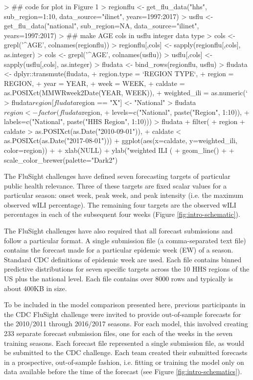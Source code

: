 \documentclass{article}
\begin{document}
\begin{Schunk}
\begin{Sinput}
> ## code for plot in Figure 1
> regionflu <- get_flu_data("hhs", sub_region=1:10, data_source="ilinet", years=1997:2017)
> usflu <- get_flu_data("national", sub_region=NA, data_source="ilinet", years=1997:2017)
> ## make AGE cols in usflu integer data type
> cols <- grepl('^AGE', colnames(regionflu))
> regionflu[,cols] <- sapply(regionflu[,cols], as.integer)
> cols <- grepl('^AGE', colnames(usflu))
> usflu[,cols] <- sapply(usflu[,cols], as.integer)
> fludata <- bind_rows(regionflu, usflu)
> fludata <- dplyr::transmute(fludata,
+     region.type = `REGION TYPE`,
+     region = REGION,
+     year = YEAR,
+     week = WEEK,
+     caldate = as.POSIXct(MMWRweek2Date(YEAR, WEEK)),
+     weighted_ili = as.numeric(`%
> fludata$region[fludata$region == "X"] <- "National"
> fludata$region <- factor(fludata$region, 
+     levels=c("National", paste("Region", 1:10)),
+     labels=c("National", paste("HHS Region", 1:10)))
> fludata %
+     filter(
+         region %
+         caldate > as.POSIXct(as.Date("2010-09-01")),
+         caldate < as.POSIXct(as.Date("2017-08-01"))) %
+     ggplot(aes(x=caldate, y=weighted_ili, color=region)) + 
+     xlab(NULL) + ylab("weighted ILI (%
+     geom_line() +
+     scale_color_brewer(palette="Dark2")
\end{Sinput}
\end{Schunk}


The FluSight challenges have defined seven forecasting targets of particular public health relevance. Three of these targets are fixed scalar values for a particular season: onset week, peak week, and peak intensity (i.e. the maximum observed wILI percentage). The remaining four targets are the observed wILI percentages in each of the subsequent four weeks (Figure \ref{fig:intro-schematic}). 

The FluSight challenges have also required that all forecast submissions and follow a particular format. A single submission file (a comma-separated text file) contains the forecast made for a particular epidemic week (EW) of a season. Standard CDC definitions of epidemic week are used. Each file contains binned predictive distributions for seven specific targets across the 10 HHS regions of the US plus the national level. Each file contains over 8000 rows and typically is about 400KB in size.

To be included in the model comparison presented here, previous participants in the CDC FluSight challenge were invited to provide out-of-sample forecasts for the 2010/2011 through 2016/2017 seasons. For each model, this involved creating 233 separate forecast submission files, one for each of the weeks in the seven training seasons.
Each forecast file represented a single submission file, as would be submitted to the CDC challenge. 
Each team created their submitted forecasts in a prospective, out-of-sample fashion, i.e. fitting or training the model only on data available before the time of the forecast (see Figure \ref{fig:intro-schematics}). 
\end{document}
